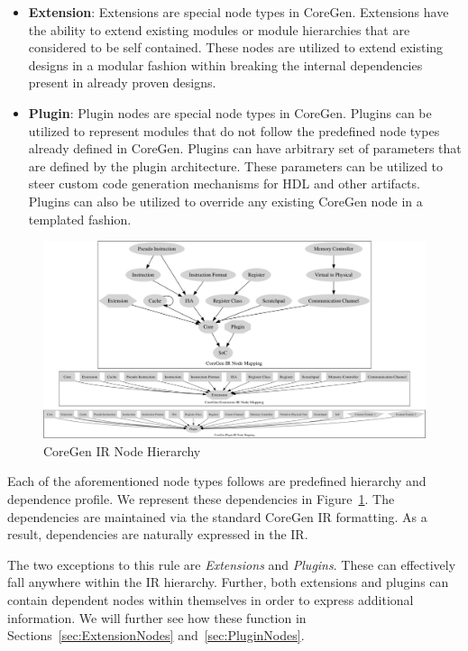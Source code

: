 \documentclass{article}
\begin{document}
\begin{itemize}
\item \textbf{Extension}: Extensions are special node types in CoreGen.  Extensions have the ability to extend existing modules or module hierarchies that are considered to be self contained.  These nodes are utilized to extend existing designs in a modular fashion within breaking the internal dependencies present in already proven designs.
\item \textbf{Plugin}: Plugin nodes are special node types in CoreGen.  Plugins can be utilized to represent modules that do not follow the predefined node types already defined in CoreGen.  Plugins can have arbitrary set of parameters that are defined by the plugin architecture.  These parameters can be utilized to steer custom code generation mechanisms for HDL and other artifacts.  Plugins can also be utilized to override any existing CoreGen node in a templated fashion.  
\end{itemize}

\begin{figure}[h]
\begin{center}
\includegraphics[width=\textwidth]{figures/NodeMapping.pdf}
\vspace*{8pt}
\caption{CoreGen IR Node Hierarchy}
\label{fig:IRNodes}
\end{center}
\end{figure}

Each of the aforementioned node types follows are predefined hierarchy and dependence profile.  We represent 
these dependencies in Figure~\ref{fig:IRNodes}.  The dependencies are maintained via the standard CoreGen IR 
formatting.  As a result, dependencies are naturally expressed in the IR.

The two exceptions to this rule are \textit{Extensions} and \textit{Plugins}.  These can effectively fall anywhere within the 
IR hierarchy.  Further, both extensions and plugins can contain dependent nodes within themselves in order to express 
additional information.  We will further see how these function in Sections~\ref{sec:ExtensionNodes} and~\ref{sec:PluginNodes}.  
\end{document}
